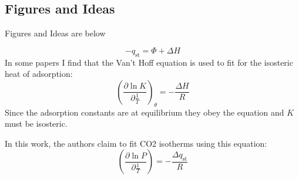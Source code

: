 \documentclass[letterpaper,twocolumn,amsmath,amssymb,jcp,aps,10pt]{revtex4-1}
\begin{document}
\subsection{Figures and Ideas}
Figures and Ideas are below






\begin{equation}
-q_\text{st} = \Phi + \Delta H
\end{equation}
In some papers I find that the Van't Hoff equation is used to fit for the isosteric heat of adsorption:
\begin{equation}
\left( \frac{\partial \ln K}{\partial \frac{1}{T}} \right)_\theta = -\frac{\Delta H}{R}
\end{equation}
Since the adsorption constants are at equilibrium they obey the equation and $K$ must be isosteric.

In this work, the authors claim to fit CO2 isotherms using this equation:~\cite{sim2014gas}
\begin{equation}
\left( \frac{\partial \ln P}{\partial \frac{1}{T}} \right) = -\frac{\Delta q_\text{st}}{R}
\end{equation}
\end{document}

